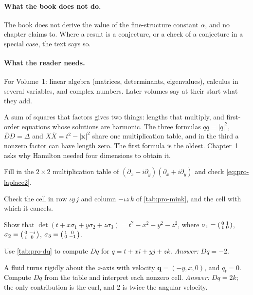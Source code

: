 \paragraph{What the book does not do.} The book does not derive the value of the fine-structure constant $\alpha$, and no chapter claims to. Where a result is a conjecture, or a check of a conjecture in a special case, the text says so.

\paragraph{What the reader needs.} For Volume~1: linear algebra (matrices, determinants, eigenvalues), calculus in several variables, and complex numbers. Later volumes say at their start what they add.

\begin{learned}
A sum of squares that factors gives two things: lengths that multiply, and first-order equations whose solutions are harmonic. The three formulas $q\bar q=|q|^2$, $\bar DD=\Delta$ and $X\bar X=t^2-|\mathbf x|^2$ share one multiplication table, and in the third a nonzero factor can have length zero. The first formula is the oldest. Chapter~1 asks why Hamilton needed four dimensions to obtain it.
\end{learned}

\begin{exercises}
\item Fill in the $2\times2$ multiplication table of $(\partial_x-i\partial_y)(\partial_x+i\partial_y)$ and check \eqref{eq:pro-laplace2}.
\item Check the cell in row $\iota y\,j$ and column $-\iota z\,k$ of \cref{tab:pro-mink}, and the cell with which it cancels.
\item Show that $\det(t+x\sigma_1+y\sigma_2+z\sigma_3)=t^2-x^2-y^2-z^2$, where $\sigma_1=\begin{psmallmatrix}0&1\\1&0\end{psmallmatrix}$, $\sigma_2=\begin{psmallmatrix}0&-i\\i&0\end{psmallmatrix}$, $\sigma_3=\begin{psmallmatrix}1&0\\0&-1\end{psmallmatrix}$.
\item Use \cref{tab:pro-dq} to compute $Dq$ for $q=t+xi+yj+zk$. \emph{Answer:} $Dq=-2$.
\item\label{ex:pro-vortex} A fluid turns rigidly about the $z$-axis with velocity $\mathbf q=(-y,x,0)$, and $q_t=0$. Compute $Dq$ from the table and interpret each nonzero cell. \emph{Answer:} $Dq=2k$; the only contribution is the curl, and $2$ is twice the angular velocity.
\end{exercises}

